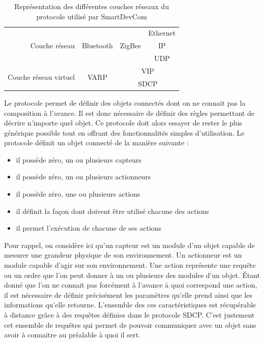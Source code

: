 		\begin{table}[!ht]
			\centering
			\begin{tabular}{r|c|c|c|}
				\cline{2-4}
				& & & Ethernet \\ \cline{4-4}
				Couche réseau & Bluetooth & ZigBee & IP \\ \cline{4-4}
				& & & UDP \\ \cline{2-4}
				\multirow{2}{*}{Couche réseau virtuel} & \multirow{2}{*}{VARP} & 
				\multicolumn{2}{c|}{VIP} \\ \cline{3-4}
				&                      & \multicolumn{2}{c|}{SDCP} \\
				\cline{2-4}
			\end{tabular}
			\caption{Représentation des différentes couches réseaux du protocole utilisé par 
					   SmartDevCom}
			\label{modeleCouche}
		\end{table}
		
		Le protocole permet de définir des objets connectés dont on ne connait pas la composition à 
		l'avance. Il est donc nécessaire de définir des règles permettant de décrire n'importe quel
		objet. Ce protocole doit alors essayer de rester le plus générique possible tout en offrant
		des fonctionnalités simples d'utilisation. Le protocole définit un objet connecté de la 
		manière suivante :
		\begin{itemize}
			\item il possède zéro, un ou plusieurs capteurs
			\item il possède zéro, un ou plusieurs actionneurs
			\item il possède zéro, une ou plusieurs actions
			\item il définit la façon dont doivent être utilisé chacune des actions
			\item il permet l'exécution de chacune de ses actions
		\end{itemize}
		
		Pour rappel, on considère ici qu'un capteur est un module d'un objet capable de mesurer une
		grandeur physique de son environnement. Un actionneur est un module capable d'agir sur son
		environnement. Une action représente une requête ou un ordre que l'on peut donner à un ou
		plusieurs des modules d'un objet. Étant donné que l'on ne connait pas forcément à l'avance
		à quoi correspond une action, il est nécessaire de définir précisément les paramètres qu'elle
		prend ainsi que les informations qu'elle retourne. L'ensemble des ces caractéristiques est
		récupérable à distance grâce à des requêtes définies dans le protocole SDCP. C'est justement
		cet ensemble de requêtes qui permet de pouvoir communiquer avec un objet sans avoir à connaitre au préalable à quoi il sert.
		
